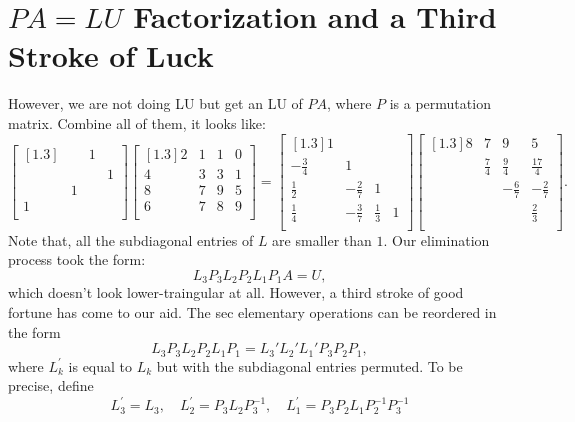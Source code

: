 \section{$ PA=LU $ Factorization and a Third Stroke of Luck}
However, we are not doing LU but get an LU of $PA$, where $P$ is a permutation matrix. Combine all of them, it looks like: 
\[
    \begin{bmatrix}[1.3] 
         &  & 1 &   \\
         &  &  &  1 \\
         & 1 &  &   \\
        1 &  &  &   \\
    \end{bmatrix} 
    \begin{bmatrix}[1.3] 
        2 & 1 & 1 &  0 \\
        4 & 3 & 3 &  1 \\
        8 & 7 & 9 &  5 \\
        6 & 7 & 8 &  9 \\
    \end{bmatrix}
    = 
    \begin{bmatrix}[1.3] 
        1 &  &  &   \\
        -\frac{3}{4} & 1 &  &   \\
        \frac{1}{2} & -\frac{2}{7} & 1 &   \\
        \frac{1}{4} & -\frac{3}{7} & \frac{1}{3} &  1 \\
    \end{bmatrix}
    \begin{bmatrix}[1.3] 
        8 & 7 & 9 &  5 \\
         & \frac{7}{4} & \frac{9}{4} &  \frac{17}{4} \\
         &  & -\frac{6}{7} &  -\frac{2}{7}  \\
         &  &  &  \frac{2}{3}   \\
    \end{bmatrix}   . 
\]
Note that, all the subdiagonal entries of $L$ are smaller than $1$. Our elimination process took the form: 
\[
    L_3P_3 L_2 P_2 L_1 P_1 A = U, 
\]
which doesn't look lower-traingular at all. However, a third stroke of good fortune has come to our aid. The sec elementary operations can be reordered in the form 
\[
    L_3P_3 L_2 P_2 L_1 P_1 = L_3' L_2' L_1' P_3 P_2 P_1, 
\]
where $L_k^{\prime}$ is equal to $L_k$ but with the subdiagonal entries permuted. To be precise, define
$$
L_3^{\prime}=L_3, \quad L_2^{\prime}=P_3 L_2 P_3^{-1}, \quad L_1^{\prime}=P_3 P_2 L_1 P_2^{-1} P_3^{-1}
$$

